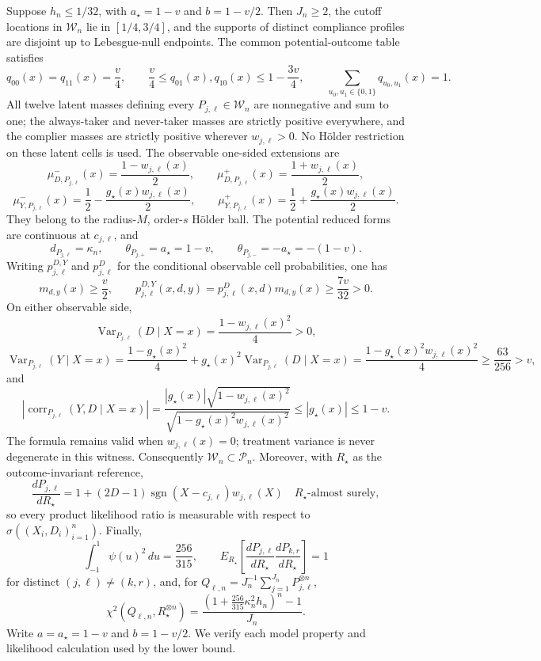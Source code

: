 Suppose \(h_n\le 1/32\), with \(a_\star=1-v\) and \(b=1-v/2\).  Then \(J_n\ge2\), the cutoff locations in \(\mathcal W_n\) lie in \([1/4,3/4]\), and the supports of distinct compliance profiles are disjoint up to Lebesgue-null endpoints.  The common potential-outcome table satisfies
\[
q_{00}(x)=q_{11}(x)=\frac v4,
\qquad
\frac v4\le q_{01}(x),q_{10}(x)\le1-\frac{3v}{4},
\qquad
\sum_{u_0,u_1\in\{0,1\}}q_{u_0,u_1}(x)=1.
\]
All twelve latent masses defining every \(P_{j,\ell}\in\mathcal W_n\) are nonnegative and sum to one; the always-taker and never-taker masses are strictly positive everywhere, and the complier masses are strictly positive wherever \(w_{j,\ell}>0\).  No H\"older restriction on these latent cells is used.  The observable one-sided extensions are
\[
\mu_{D,P_{j,\ell}}^{-}(x)=\frac{1-w_{j,\ell}(x)}2,
\qquad
\mu_{D,P_{j,\ell}}^{+}(x)=\frac{1+w_{j,\ell}(x)}2,
\]
\[
\mu_{Y,P_{j,\ell}}^{-}(x)=\frac12-\frac{g_\star(x)w_{j,\ell}(x)}2,
\qquad
\mu_{Y,P_{j,\ell}}^{+}(x)=\frac12+\frac{g_\star(x)w_{j,\ell}(x)}2.
\]
They belong to the radius-\(M\), order-\(s\) H\"older ball.  The potential reduced forms are continuous at \(c_{j,\ell}\), and
\[
d_{P_{j,\ell}}=\kappa_n,
\qquad
\theta_{P_{j,+}}=a_\star=1-v,
\qquad
\theta_{P_{j,-}}=-a_\star=-(1-v).
\]
Writing \(p_{j,\ell}^{D,Y}\) and \(p_{j,\ell}^{D}\) for the conditional observable cell probabilities, one has
\[
m_{d,y}(x)\ge\frac v2,
\qquad
p_{j,\ell}^{D,Y}(x,d,y)
=p_{j,\ell}^{D}(x,d)m_{d,y}(x)
\ge\frac{7v}{32}>0.
\]
On either observable side,
\[
\operatorname{Var}_{P_{j,\ell}}(D\mid X=x)=\frac{1-w_{j,\ell}(x)^2}{4}>0,
\]
\[
\operatorname{Var}_{P_{j,\ell}}(Y\mid X=x)
=\frac{1-g_\star(x)^2}{4}
+g_\star(x)^2\operatorname{Var}_{P_{j,\ell}}(D\mid X=x)
=\frac{1-g_\star(x)^2w_{j,\ell}(x)^2}{4}
\ge\frac{63}{256}>v,
\]
and
\[
\left|\operatorname{corr}_{P_{j,\ell}}(Y,D\mid X=x)\right|
=\frac{|g_\star(x)|\sqrt{1-w_{j,\ell}(x)^2}}
       {\sqrt{1-g_\star(x)^2w_{j,\ell}(x)^2}}
\le |g_\star(x)|\le1-v.
\]
The formula remains valid when \(w_{j,\ell}(x)=0\); treatment variance is never degenerate in this witness.  Consequently \(\mathcal W_n\subset\mathcal P_n\).  Moreover, with \(R_\star\) as the outcome-invariant reference,
\[
\frac{dP_{j,\ell}}{dR_\star}
=1+(2D-1)\operatorname{sgn}(X-c_{j,\ell})w_{j,\ell}(X)
\quad R_\star\text{-almost surely},
\]
so every product likelihood ratio is measurable with respect to \(\sigma((X_i,D_i)_{i=1}^n)\).  Finally,
\[
\int_{-1}^{1}\psi(u)^2\,du=\frac{256}{315},
\qquad
E_{R_\star}\!\left[
\frac{dP_{j,\ell}}{dR_\star}
\frac{dP_{k,r}}{dR_\star}
\right]=1
\]
for distinct \((j,\ell)\ne(k,r)\), and, for
\(Q_{\ell,n}=J_n^{-1}\sum_{j=1}^{J_n}P_{j,\ell}^{\otimes n}\),
\[
\chi^2(Q_{\ell,n},R_\star^{\otimes n})
=\frac{\left(1+\frac{256}{315}\kappa_n^2h_n\right)^n-1}{J_n}.
\]
Write \(a=a_\star=1-v\) and \(b=1-v/2\).  We verify each model property and likelihood calculation used by the lower bound.

